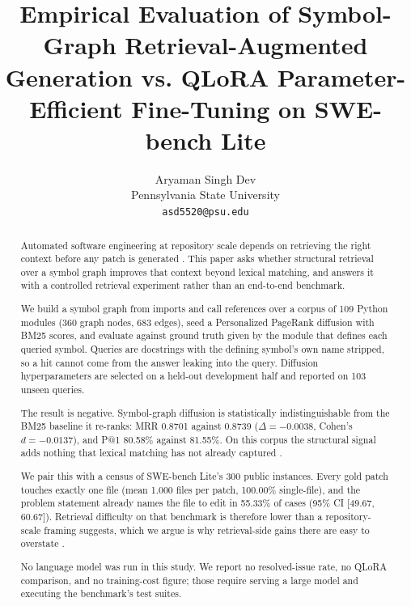 \documentclass[10pt,journal,compsoc,twocolumn]{IEEEtran}
\begin{document}
\title{Empirical Evaluation of Symbol-Graph Retrieval-Augmented Generation vs. QLoRA Parameter-Efficient Fine-Tuning on SWE-bench Lite}

\author{
Aryaman Singh Dev\\
Pennsylvania State University \\
\texttt{asd5520@psu.edu}
}

\maketitle

\begin{abstract}
Automated software engineering at repository scale depends on retrieving the right context before any patch is generated \cite{arxiv_2405_01543}. This paper asks whether structural retrieval over a symbol graph improves that context beyond lexical matching, and answers it with a controlled retrieval experiment rather than an end-to-end benchmark.

We build a symbol graph from imports and call references over a corpus of 109 Python modules (360 graph nodes, 683 edges), seed a Personalized PageRank diffusion with BM25 scores, and evaluate against ground truth given by the module that defines each queried symbol. Queries are docstrings with the defining symbol's own name stripped, so a hit cannot come from the answer leaking into the query. Diffusion hyperparameters are selected on a held-out development half and reported on 103 unseen queries.

The result is negative. Symbol-graph diffusion is statistically indistinguishable from the BM25 baseline it re-ranks: MRR 0.8701 against 0.8739 ($\Delta = -0.0038$, Cohen's $d = -0.0137$), and P@1 80.58\% against 81.55\%. On this corpus the structural signal adds nothing that lexical matching has not already captured \cite{arxiv_2501_02497}.

We pair this with a census of SWE-bench Lite's 300 public instances. Every gold patch touches exactly one file (mean 1.000 files per patch, 100.00\% single-file), and the problem statement already names the file to edit in 55.33\% of cases (95\% CI [49.67, 60.67]). Retrieval difficulty on that benchmark is therefore lower than a repository-scale framing suggests, which we argue is why retrieval-side gains there are easy to overstate \cite{crossref_10_1201_9788743808145_14}.

No language model was run in this study. We report no resolved-issue rate, no QLoRA comparison, and no training-cost figure; those require serving a large model and executing the benchmark's test suites.
\end{abstract}
\end{document}
